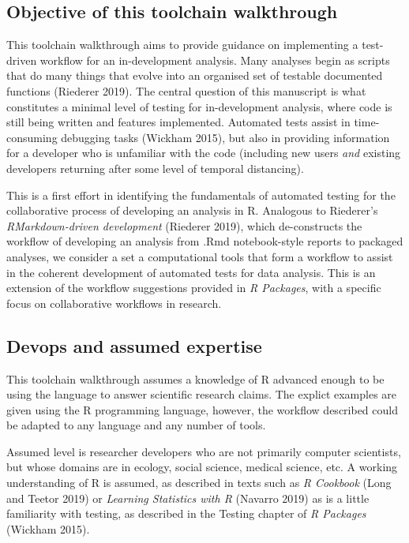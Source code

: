 \documentclass[
]{article}
\begin{document}
\hypertarget{objective-of-this-toolchain-walkthrough}{%
\subsection{Objective of this toolchain walkthrough}\label{objective-of-this-toolchain-walkthrough}}

This toolchain walkthrough aims to provide guidance on implementing a test-driven workflow for an in-development analysis. Many analyses begin as scripts that do many things that evolve into an organised set of testable documented functions (Riederer 2019). The central question of this manuscript is what constitutes a minimal level of testing for in-development analysis, where code is still being written and features implemented. Automated tests assist in time-consuming debugging tasks (Wickham 2015), but also in providing information for a developer who is unfamiliar with the code (including new users \emph{and} existing developers returning after some level of temporal distancing).

This is a first effort in identifying the fundamentals of automated testing for the collaborative process of developing an analysis in R. Analogous to Riederer's \emph{RMarkdown-driven development} (Riederer 2019), which de-constructs the workflow of developing an analysis from .Rmd notebook-style reports to packaged analyses, we consider a set a computational tools that form a workflow to assist in the coherent development of automated tests for data analysis. This is an extension of the workflow suggestions provided in \emph{R Packages}, with a specific focus on collaborative workflows in research.

\hypertarget{devops-and-assumed-expertise}{%
\subsection{Devops and assumed expertise}\label{devops-and-assumed-expertise}}

This toolchain walkthrough assumes a knowledge of R advanced enough to be using the language to answer scientific research claims. The explict examples are given using the R programming language, however, the workflow described could be adapted to any language and any number of tools.

Assumed level is researcher developers who are not primarily computer scientists, but whose domains are in ecology, social science, medical science, etc. A working understanding of R is assumed, as described in texts such as \emph{R Cookbook} (Long and Teetor 2019) or \emph{Learning Statistics with R} (Navarro 2019) as is a little familiarity with testing, as described in the Testing chapter of \emph{R Packages} (Wickham 2015).
\end{document}
